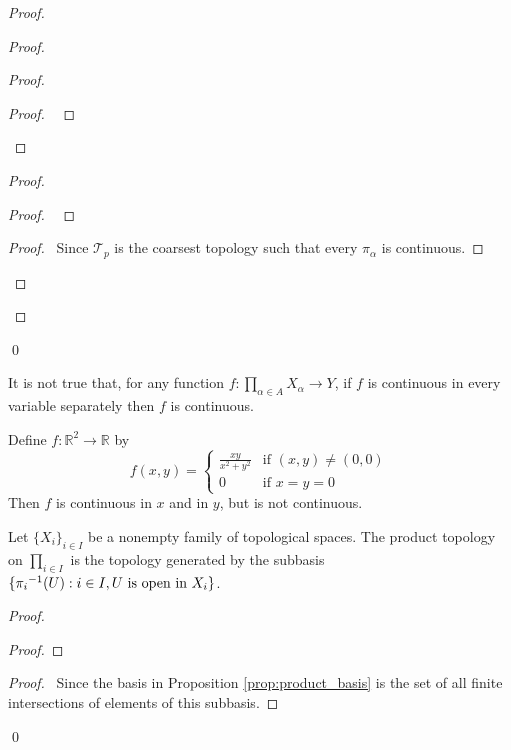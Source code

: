 \begin{proof}
\begin{proof}
	\begin{proof}
		\begin{proof}
			\pf\ 
		\end{proof}
	\end{proof}
	\begin{proof}
		\begin{proof}
			\pf\ 
		\end{proof}
		\begin{proof}
			\pf\ Since $\mathcal{T}_p$ is the coarsest topology such that every $\pi_\alpha$ is continuous.
		\end{proof}
	\end{proof}
\end{proof}
\qed
\end{proof}

\begin{ex}
It is not true that, for any function $f : \prod_{\alpha \in A} X_\alpha \rightarrow Y$, if $f$ is continuous in every variable separately then $f$ is continuous.

Define $f : \mathbb{R}^2 \rightarrow \mathbb{R}$ by
\[ f(x,y) = \begin{cases}
\frac{xy}{x^2 + y^2} & \text{if } (x,y) \neq (0,0) \\
0 & \text{if } x = y = 0
\end{cases} \]
Then $f$ is continuous in $x$ and in $y$, but is not continuous.
\end{ex}

\begin{prop}
Let $\{X_i\}_{i \in I}$ be a nonempty family of topological spaces. The product topology on $\prod_{i \in I}$ is the topology generated by the subbasis $\{ {\pi_i}^{-1}(U) : i \in I, U \text{ is open in } X_i \}$.
\end{prop}

\begin{proof}
\pf
{}
\begin{proof}
\end{proof}
\begin{proof}
	\pf\ Since the basis in Proposition \ref{prop:product_basis} is the set of all finite intersections of elements of this subbasis.
\end{proof}
\qed
\end{proof}

